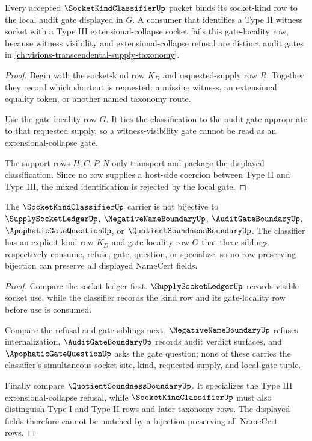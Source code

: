 \begin{theorem}
\label{thm:socket-kind-classifier-gate-locality-exactness}
Every accepted $\SocketKindClassifierUp$ packet binds its socket-kind row to the local audit gate displayed in $G$. A consumer that identifies a Type II witness socket with a Type III extensional-collapse socket fails this gate-locality row, because witness visibility and extensional-collapse refusal are distinct audit gates in \autoref{ch:visions-transcendental-supply-taxonomy}.
\end{theorem}
\begin{proof}
Begin with the socket-kind row $K_D$ and requested-supply row $R$. Together they record which shortcut is requested: a missing witness, an extensional equality token, or another named taxonomy route.

Use the gate-locality row $G$. It ties the classification to the audit gate appropriate to that requested supply, so a witness-visibility gate cannot be read as an extensional-collapse gate.

The support rows $H,C,P,N$ only transport and package the displayed classification. Since no row supplies a host-side coercion between Type II and Type III, the mixed identification is rejected by the local gate.
\end{proof}

\begin{theorem}
\label{thm:socket-kind-classifier-sibling-separation}
The $\SocketKindClassifierUp$ carrier is not bijective to $\SupplySocketLedgerUp$, $\NegativeNameBoundaryUp$, $\AuditGateBoundaryUp$, $\ApophaticGateQuestionUp$, or $\QuotientSoundnessBoundaryUp$. The classifier has an explicit kind row $K_D$ and gate-locality row $G$ that these siblings respectively consume, refuse, gate, question, or specialize, so no row-preserving bijection can preserve all displayed NameCert fields.
\end{theorem}
\begin{proof}
Compare the socket ledger first. $\SupplySocketLedgerUp$ records visible socket use, while the classifier records the kind row and its gate-locality row before use is consumed.

Compare the refusal and gate siblings next. $\NegativeNameBoundaryUp$ refuses internalization, $\AuditGateBoundaryUp$ records audit verdict surfaces, and $\ApophaticGateQuestionUp$ asks the gate question; none of these carries the classifier's simultaneous socket-site, kind, requested-supply, and local-gate tuple.

Finally compare $\QuotientSoundnessBoundaryUp$. It specializes the Type III extensional-collapse refusal, while $\SocketKindClassifierUp$ must also distinguish Type I and Type II rows and later taxonomy rows. The displayed fields therefore cannot be matched by a bijection preserving all NameCert rows.
\end{proof}

